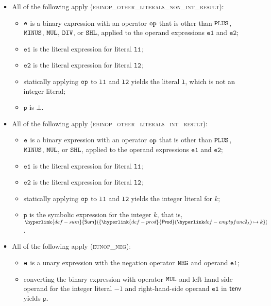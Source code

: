 \documentclass{book}
\newcommand\Prod[0]{\hyperlink{def-prod}{\textsf{Prod}}}
\newcommand\Sum[0]{\hyperlink{def-sum}{\textsf{Sum}}}
\newcommand\vl[0]{\texttt{l}}
\newcommand\vp[0]{\texttt{p}}
\newcommand\veone[0]{\texttt{e1}}
\newcommand\vetwo[0]{\texttt{e2}}
\newcommand\vlone[0]{\texttt{l1}}
\newcommand\vltwo[0]{\texttt{l2}}
\begin{document}
\begin{itemize}
  \item All of the following apply (\textsc{ebinop\_other\_literals\_non\_int\_result}):
  \begin{itemize}
    \item $\texttt{e}$ is a binary expression with an operator $\texttt{op}$ that is other than $\texttt{PLUS}$, $\texttt{MINUS}$, $\texttt{MUL}$, $\texttt{DIV}$, or $\texttt{SHL}$,
          applied to the operand expressions $\veone$ and $\vetwo$;
    \item $\veone$ is the literal expression for literal $\vlone$;
    \item $\vetwo$ is the literal expression for literal $\vltwo$;
    \item statically applying $\texttt{op}$ to $\vlone$ and $\vltwo$ yields the literal $\vl$, which is not an integer literal;
    \item $\vp$ is $\bot$.
  \end{itemize}

  \item All of the following apply (\textsc{ebinop\_other\_literals\_int\_result}):
  \begin{itemize}
    \item $\texttt{e}$ is a binary expression with an operator $\texttt{op}$ that is other than $\texttt{PLUS}$, $\texttt{MINUS}$, $\texttt{MUL}$, or $\texttt{SHL}$,
          applied to the operand expressions $\veone$ and $\vetwo$;
    \item $\veone$ is the literal expression for literal $\vlone$;
    \item $\vetwo$ is the literal expression for literal $\vltwo$;
    \item statically applying $\texttt{op}$ to $\vlone$ and $\vltwo$ yields the integer literal for $k$;
    \item $\vp$ is the symbolic expression for the integer $k$, that is, $\Sum( \{ \Prod(\emptyfunc)\mapsto k \} )$.
  \end{itemize}

  \item All of the following apply (\textsc{eunop\_neg}):
  \begin{itemize}
    \item $\texttt{e}$ is a unary expression with the negation operator $\texttt{NEG}$ and operand $\veone$;
    \item converting the binary expression with operator $\texttt{MUL}$ and left-hand-side operand for the integer literal $-1$ and
    right-hand-side operand $\veone$ in $\textsf{tenv}$ yields $\vp$\ProseOrTypeErrorOrBot.
  \end{itemize}


\end{itemize}
\end{document}
